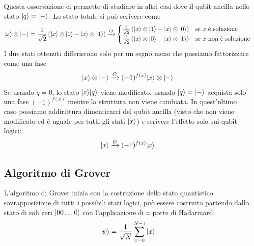 \documentclass[12pt, a4paper]{report}
\begin{document}
Questa osservazione ci permette di studiare in altri casi dove il qubit ancilla nello stato $| q \rangle=| - \rangle$. Lo stato totale si può scrivere come
\begin{equation*}
    | x \rangle\otimes| - \rangle = \frac{1}{\sqrt{2}}\left(| x \rangle\otimes| 0 \rangle-| x \rangle\otimes| 1 \rangle\right) \xrightarrow{O}\begin{cases}
        \frac{1}{\sqrt{2}}\left(| x \rangle\otimes| 1 \rangle-| x \rangle\otimes| 0 \rangle\right) & \text{se $x$ è soluzione} \\
        \frac{1}{\sqrt{2}}\left(| x \rangle\otimes| 0 \rangle-| x \rangle\otimes| 1 \rangle\right) & \text{se $x$ non è soluzione} \\
    \end{cases}
\end{equation*}
I due stati ottenuti differiscono solo per un segno meno che possiamo fattorizzare come una fase
\begin{equation*}
    | x \rangle\otimes| - \rangle\xrightarrow{O}(-1)^{f(x)}| x \rangle\otimes| - \rangle
\end{equation*}
Se usando $q=0$, lo stato $| x \rangle| q \rangle$ viene modificato, usando $| q \rangle=| - \rangle$ acquista solo una fase $(-1)^{f(x)}$ mentre la struttura non viene cambiata. In quest'ultimo caso possiamo addirittura dimenticarci del qubit ancilla (visto che non viene modificato ed è uguale per tutti gli stati $| x \rangle$) e scrivere l'effetto solo sui qubit logici:
\begin{equation*}
    | x \rangle\xrightarrow{O}(-1)^{f(x)}| x \rangle
\end{equation*}
\subsection{Algoritmo di Grover}
L'algoritmo di Grover inizia con la costruzione dello stato quantistico sovrapposizione di tutti i possibili stati logici, può essere costruito partendo dallo stato di soli zeri $| 00\ldots  0 \rangle$ con l'applicazione di $n$ porte di Hadarmard:
\begin{equation*}
    | \psi \rangle = \frac{1}{\sqrt{N}}\sum_{x=0}^{N-1}| x \rangle
\end{equation*}
\end{document}
